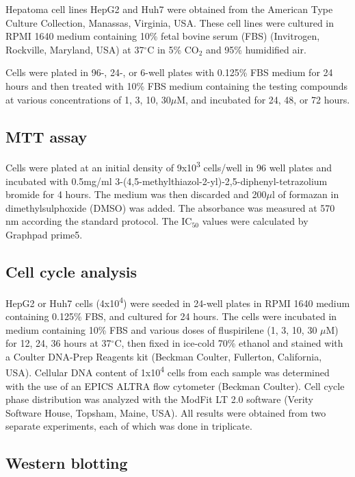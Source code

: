 \documentclass[10pt,letterpaper]{article}
\begin{document}
Hepatoma cell lines HepG2 and Huh7 were obtained from the American Type Culture Collection, Manassas, Virginia, USA. These cell lines were cultured in RPMI 1640 medium containing 10\% fetal bovine serum (FBS) (Invitrogen, Rockville, Maryland, USA) at 37$^\circ$C in 5\% CO$_2$ and 95\% humidified air.

Cells were plated in 96-, 24-, or 6-well plates with 0.125\% FBS medium for 24 hours and then treated with 10\% FBS medium containing the testing compounds at various concentrations of 1, 3, 10, 30$\mu$M, and incubated for 24, 48, or 72 hours.

\subsection*{MTT assay}

Cells were plated at an initial density of 9x10\textsuperscript{3} cells/well in 96 well plates and incubated with 0.5mg/ml 3-(4,5-methylthiazol-2-yl)-2,5-diphenyl-tetrazolium bromide for 4 hours. The medium was then discarded and 200$\mu$l of formazan in dimethylsulphoxide (DMSO) was added. The absorbance was measured at 570 nm according the standard protocol. The IC$_{50}$ values were calculated by Graphpad prime5.

\subsection*{Cell cycle analysis}

HepG2 or Huh7 cells (4x10\textsuperscript{4}) were seeded in 24-well plates in RPMI 1640 medium containing 0.125\% FBS, and cultured for 24 hours. The cells were incubated in medium containing 10\% FBS and various doses of fluspirilene (1, 3, 10, 30 $\mu$M) for 12, 24, 36 hours at 37$^\circ$C, then fixed in ice-cold 70\% ethanol and stained with a Coulter DNA-Prep Reagents kit (Beckman Coulter, Fullerton, California, USA). Cellular DNA content of 1x10\textsuperscript{4} cells from each sample was determined with the use of an EPICS ALTRA flow cytometer (Beckman Coulter). Cell cycle phase distribution was analyzed with the ModFit LT 2.0 software (Verity Software House, Topsham, Maine, USA). All results were obtained from two separate experiments, each of which was done in triplicate.

\subsection*{Western blotting}
\end{document}
